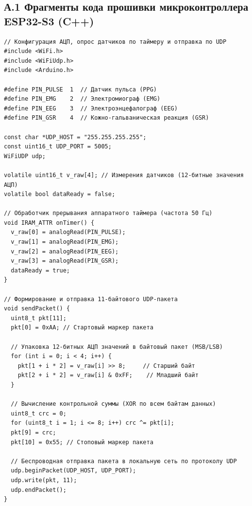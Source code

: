 \documentclass[utf8, russian]{eskdtext}
\begin{document}
\subsection*{А.1 Фрагменты кода прошивки микроконтроллера ESP32-S3 (C++)}
\begin{verbatim}
// Конфигурация АЦП, опрос датчиков по таймеру и отправка по UDP
#include <WiFi.h>
#include <WiFiUdp.h>
#include <Arduino.h>

#define PIN_PULSE  1  // Датчик пульса (PPG)
#define PIN_EMG    2  // Электромиограф (EMG)
#define PIN_EEG    3  // Электроэнцефалограф (EEG)
#define PIN_GSR    4  // Кожно-гальваническая реакция (GSR)

const char *UDP_HOST = "255.255.255.255";
const uint16_t UDP_PORT = 5005;
WiFiUDP udp;

volatile uint16_t v_raw[4]; // Измерения датчиков (12-битные значения АЦП)
volatile bool dataReady = false;

// Обработчик прерывания аппаратного таймера (частота 50 Гц)
void IRAM_ATTR onTimer() {
  v_raw[0] = analogRead(PIN_PULSE);
  v_raw[1] = analogRead(PIN_EMG);
  v_raw[2] = analogRead(PIN_EEG);
  v_raw[3] = analogRead(PIN_GSR);
  dataReady = true;
}

// Формирование и отправка 11-байтового UDP-пакета
void sendPacket() {
  uint8_t pkt[11];
  pkt[0] = 0xAA; // Стартовый маркер пакета
  
  // Упаковка 12-битных АЦП значений в байтовый пакет (MSB/LSB)
  for (int i = 0; i < 4; i++) {
    pkt[1 + i * 2] = v_raw[i] >> 8;     // Старший байт
    pkt[2 + i * 2] = v_raw[i] & 0xFF;    // Младший байт
  }
  
  // Вычисление контрольной суммы (XOR по всем байтам данных)
  uint8_t crc = 0;
  for (uint8_t i = 1; i <= 8; i++) crc ^= pkt[i];
  pkt[9] = crc; 
  pkt[10] = 0x55; // Стоповый маркер пакета

  // Беспроводная отправка пакета в локальную сеть по протоколу UDP
  udp.beginPacket(UDP_HOST, UDP_PORT);
  udp.write(pkt, 11);
  udp.endPacket();
}
\end{verbatim}
\end{document}
